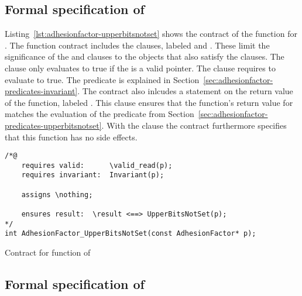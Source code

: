 \FloatBarrier

\subsection{Formal specification of }
\label{sec:adhesionfactor-upperbitsnotset}

Listing~\ref{lst:adhesionfactor-upperbitsnotset} shows the contract of the 
function for .
The function contract includes the  clauses, labeled  and .
These limit the significance of the  and  clauses to
the  objects that also satisfy the  clauses.
The  clause only evaluates to true if the  is a valid pointer.
The  clause requires  to evaluate to true.
The  predicate is explained
in Section~\ref{sec:adhesionfactor-predicates-invariant}.
The contract also inlcudes a statement on the return value of the function, labeled .
This clause ensures that the function's return value for 
matches the evaluation of the predicate 
from Section~\ref{sec:adhesionfactor-predicates-upperbitsnotset}.
With the  clause the contract furthermore
specifies that this function has no side effects.

\begin{listing}[hbt]
\begin{minipage}{0.99\textwidth}
\begin{lstlisting}[style=acsl-block]
/*@
    requires valid:      \valid_read(p);
    requires invariant:  Invariant(p);

    assigns \nothing;

    ensures result:  \result <==> UpperBitsNotSet(p);
*/
int AdhesionFactor_UpperBitsNotSet(const AdhesionFactor* p);
\end{lstlisting}
\end{minipage}
\caption{\label{lst:adhesionfactor-upperbitsnotset}Contract for  function of }
\end{listing}

\FloatBarrier


\subsection{Formal specification of }
\label{sec:adhesionfactor-decodebit}


